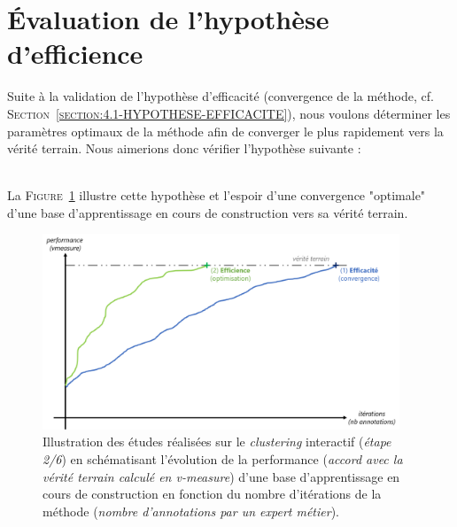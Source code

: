 \section{Évaluation de l'hypothèse d'efficience}
\label{section:4.2-HYPOTHESE-EFFICIENCE}

	Suite à la validation de l'hypothèse d'efficacité (convergence de la méthode, cf. \textsc{Section~\ref{section:4.1-HYPOTHESE-EFFICACITE}}), nous voulons déterminer les paramètres optimaux de la méthode afin de converger le plus rapidement vers la vérité terrain.
	Nous aimerions donc vérifier l'hypothèse suivante :

	\begin{tcolorbox}[
		title=\faVial~\textbf{Hypothèse d'efficience}~\faVial,
		colback=colorTcolorboxHypothesis!15,
		colframe=colorTcolorboxHypothesis!75,
		width=\linewidth
	]

		 \\
		
		La \textsc{Figure~\ref{figure:4.2-HYPOTHESE-EFFICIENCE}} illustre cette hypothèse et l'espoir d'une convergence "optimale" d'une base d'apprentissage en cours de construction vers sa vérité terrain.
		\begin{figure}[H]  %
			\centering
			\includegraphics[width=0.95\textwidth]{figures/hypotheses-02-efficience}
			\caption{
				Illustration des études réalisées sur le \textit{clustering} interactif (\textit{étape 2/6}) en schématisant l'évolution de la performance (\textit{accord avec la vérité terrain calculé en v-measure}) d'une base d'apprentissage en cours de construction en fonction du nombre d'itérations de la méthode (\textit{nombre d'annotations par un expert métier}).
			}
			\label{figure:4.2-HYPOTHESE-EFFICIENCE}
		\end{figure}
	\end{tcolorbox}
	
